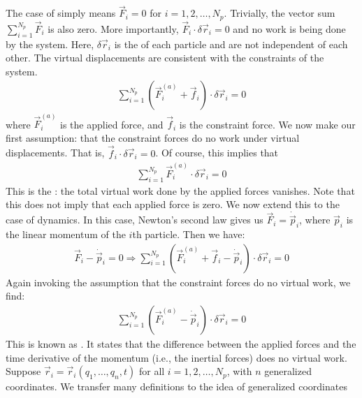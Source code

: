 The case of  simply means $\vec{F}_{i} = 0$ for $i = 1,2,\ldots,N_{p}$. Trivially, the vector sum $\sum_{i=1}^{N_{p}} \vec{F}_{i}$ is also zero. More importantly, $\vec{F}_{i} \cdot \delta \vec{r}_{i} = 0$ and no work is being done by the system. Here, $\delta \vec{r}_{i}$ is the  of each particle and are not independent of each other. The virtual displacements are consistent with the constraints of the system.
\begin{align}
    \sum_{i=1}^{N_{p}} (\vec{F}_{i}^{(a)} + \vec{f}_{i}) \cdot \delta \vec{r}_{i} = 0
\end{align}
where $\vec{F}_{i}^{(a)}$ is the applied force, and $\vec{f}_{i}$ is the constraint force. We now make our first assumption: that the constraint forces do no work under virtual displacements. That is, $\vec{f}_{i} \cdot \delta \vec{r}_{i} = 0$. Of course, this implies that
\begin{align}
    \sum_{i=1}^{N_{p}} \vec{F}_{i}^{(a)} \cdot \delta \vec{r}_{i} = 0
\end{align}
This is the : the total virtual work done by the applied forces vanishes. Note that this does not imply that each applied force is zero. We now extend this to the case of dynamics. In this case, Newton's second law gives us $\vec{F}_{i} = \dot{\vec{p}}_{i}$, where $\vec{p}_{i}$ is the linear momentum of the $i$th particle. Then we have:
\begin{align}
    \vec{F}_{i} - \dot{\vec{p}}_{i} = 0 \Rightarrow \sum_{i=1}^{N_{p}} (\vec{F}_{i}^{(a)} + \vec{f}_{i} - \dot{\vec{p}}_{i}) \cdot \delta \vec{r}_{i} = 0
\end{align}
Again invoking the assumption that the constraint forces do no virtual work, we find:
\begin{align}
    \sum_{i=1}^{N_{p}} (\vec{F}_{i}^{(a)} - \dot{\vec{p}}_{i}) \cdot \delta \vec{r}_{i} = 0
\end{align}
This is known as . It states that the difference between the applied forces and the time derivative of the momentum (i.e., the inertial forces) does no virtual work.\\

Suppose $\vec{r}_{i} = \vec{r}_{i}(q_{1},\ldots,q_{n},t)$ for all $i = 1,2,\ldots,N_{p}$, with $n$ generalized coordinates. We transfer many definitions to the idea of generalized coordinates

